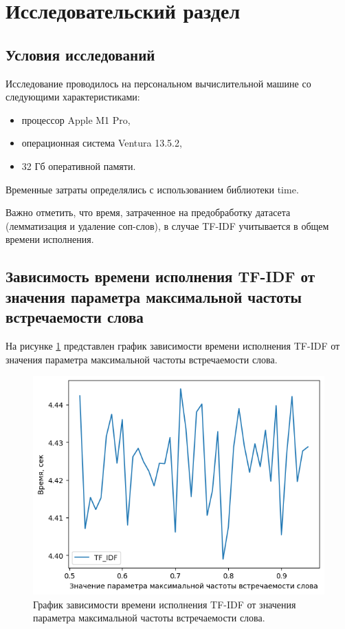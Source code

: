 \section{Исследовательский раздел}
\subsection{Условия исследований}
Исследование проводилось на персональном вычислительной машине со следующими характеристиками:

\begin{itemize}
\item процессор Apple M1 Pro,
\item операционная система Ventura 13.5.2,
\item 32 Гб оперативной памяти.
\end{itemize}

Временные затраты определялись с использованием библиотеки time.

Важно отметить, что время, затраченное на предобработку датасета (лемматизация и удаление соп-слов), в случае TF-IDF учитывается в общем времени исполнения.

\subsection{Зависимость времени исполнения TF-IDF от значения параметра максимальной частоты встречаемости слова}

На рисунке \ref{img:time1} представлен график зависимости времени исполнения TF-IDF от значения параметра максимальной частоты встречаемости слова.

\begin{figure}[H]
	\centering
	\includegraphics[width=\textwidth]{inc/timesMaxDfTfIdf.png}
	\caption{ График зависимости времени исполнения TF-IDF от значения параметра максимальной частоты встречаемости слова.}
	\label{img:time1}
\end{figure}

